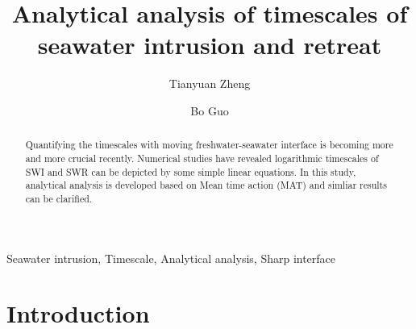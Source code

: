 \documentclass[review]{elsarticle}
\begin{document}
\begin{frontmatter}

\title{Analytical analysis of timescales of seawater intrusion and retreat}

\author[label1,label2]{Tianyuan Zheng}
\author[label3]{Bo Guo}
\address[label1]{Department of Environmental Informatics, Helmholtz Centre for Environmental Research - UFZ, Permoserstra{\ss}e 15, 04318 Leipzig, Germany}
\address[label2]{Applied Environmental Systems Analysis, Dresden University of Technology, Germany}
\address[label3]{Civil and Environmental Engineering, Princeton University, NJ, US, 08544}




\begin{abstract}
Quantifying the timescales with moving freshwater-seawater interface is becoming more and more crucial recently. Numerical studies have revealed logarithmic timescales of SWI and SWR can be depicted by some simple linear equations. In this study, analytical analysis is developed based on Mean time action (MAT) and simliar results can be clarified.  
\end{abstract}

\begin{keyword}
Seawater intrusion, Timescale, Analytical analysis, Sharp interface
\end{keyword}

\end{frontmatter}

\linenumbers

\section{Introduction}
\end{document}
